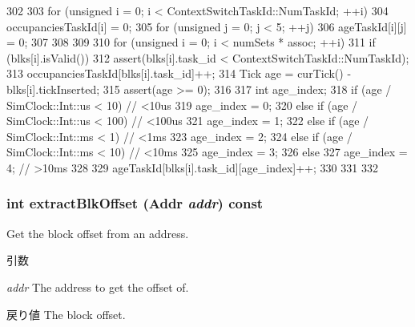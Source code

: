 \begin{DoxyCode}
302 {
303     for (unsigned i = 0; i < ContextSwitchTaskId::NumTaskId; ++i) {
304         occupanciesTaskId[i] = 0;
305         for (unsigned j = 0; j < 5; ++j) {
306             ageTaskId[i][j] = 0;
307         }
308     }
309 
310     for (unsigned i = 0; i < numSets * assoc; ++i) {
311         if (blks[i].isValid()) {
312             assert(blks[i].task_id < ContextSwitchTaskId::NumTaskId);
313             occupanciesTaskId[blks[i].task_id]++;
314             Tick age = curTick() - blks[i].tickInserted;
315             assert(age >= 0);
316 
317             int age_index;
318             if (age / SimClock::Int::us < 10) { // <10us
319                 age_index = 0;
320             } else if (age / SimClock::Int::us < 100) { // <100us
321                 age_index = 1;
322             } else if (age / SimClock::Int::ms < 1) { // <1ms
323                 age_index = 2;
324             } else if (age / SimClock::Int::ms < 10) { // <10ms
325                 age_index = 3;
326             } else
327                 age_index = 4; // >10ms
328 
329             ageTaskId[blks[i].task_id][age_index]++;
330         }
331     }
332 }
\end{DoxyCode}
\hypertarget{classLRU_aca82d98193a0685a9648acf6127abb1c}{
\subsubsection[{extractBlkOffset}]{\setlength{\rightskip}{0pt plus 5cm}int extractBlkOffset ({\bf Addr} {\em addr}) const}}
\label{classLRU_aca82d98193a0685a9648acf6127abb1c}
Get the block offset from an address. 
\begin{DoxyParams}{引数}
\item[{\em addr}]The address to get the offset of. \end{DoxyParams}
\begin{DoxyReturn}{戻り値}
The block offset. 
\end{DoxyReturn}



